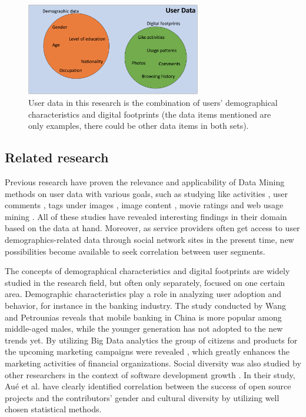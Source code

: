 \begin{figure}[h] 
  \begin{center}
    \includegraphics[width=3in]{Images/user_data_venn.png}
    \caption{User data in this research is the combination of users' demographical characteristics and digital footprints (the data items mentioned are only examples, there could be other data items in both sets).}
    \label{user_data_venn}
  \end{center}
\end{figure}

\subsection{Related research}
Previous research have proven the relevance and applicability of Data Mining methods on user data with various goals, such as studying like activities \cite{jang2015noreciprocity, jang2016teensengagemorewithfewerphotos, ottoni2013ladies, guy2016whatsyourorganizationlike, jang2015no}, user comments \cite{jang2016teensengagemorewithfewerphotos}, tags under images \cite{jang2016teensengagemorewithfewerphotos}, image content \cite{hu2014we, bakhshi2014faces}, movie ratings \cite{saraee2004data, kabinsingha2012movie} and web usage mining \cite{webusagemining}. All of these studies have revealed interesting findings in their domain based on the data at hand. Moreover, as service providers often get access to user demographics-related data through social network sites in the present time, new possibilities become available to seek correlation between user segments. 

The concepts of demographical characteristics and digital footprints are widely studied in the research field, but often only separately, focused on one certain area. Demographic characteristics play a role in analyzing user adoption and behavior, for instance in the banking industry. The study conducted by Wang and Petrounias \cite{chinesemobilebankingusers} reveals that mobile banking in China is more popular among middle-aged males, while the younger generation has not adopted to the new trends yet. By utilizing Big Data analytics the group of citizens and products for the upcoming marketing campaigns were revealed \cite{chinesemobilebankingusers}, which greatly enhances the marketing activities of financial organizations. Social diversity was also studied by other researchers in the context of software development growth \cite{socialdiversityongithub}. In their study, Au\'e et al. \cite{socialdiversityongithub} have clearly identified correlation between the success of open source projects and the contributors' gender and cultural diversity by utilizing well chosen statistical methods. 

